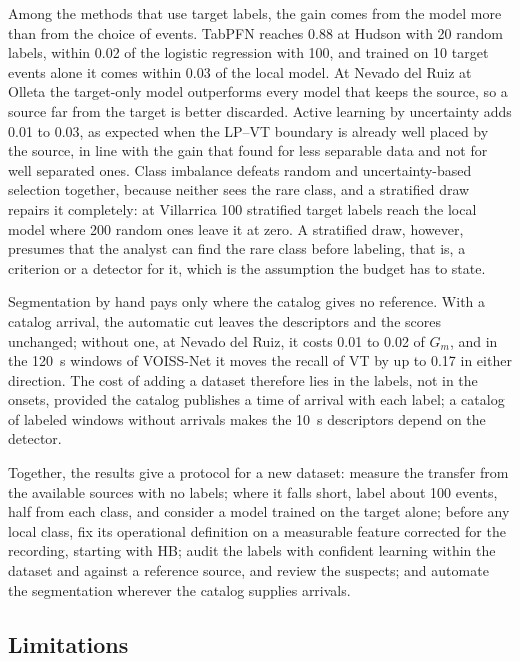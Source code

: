 \documentclass[pdflatex,sn-mathphys-num]{sn-jnl}
\begin{document}
Among the methods that use target labels, the gain comes from the model more
than from the choice of events. TabPFN reaches 0.88 at Hudson with 20 random labels, within 0.02 of the
logistic regression with 100, and trained on 10 target events alone it
comes within 0.03 of the local model. At Nevado del Ruiz at Olleta the
target-only model outperforms every model that keeps the source, so a
source far from the target is better discarded. Active
learning by uncertainty adds 0.01 to 0.03, as expected when the LP--VT
boundary is already well placed by the source, in line with the gain that \cite{manley_deep_2022} found for less separable
data and not for well separated ones. Class imbalance defeats random and
uncertainty-based selection together, because neither sees the rare class,
and a stratified draw repairs it completely: at Villarrica 100 stratified
target labels reach the local model where 200 random ones leave it at zero.
A stratified draw, however, presumes that the analyst can find the rare
class before labeling, that is, a criterion or a detector for it, which is
the assumption the budget has to state.

Segmentation by hand pays only where the catalog gives no reference. With a
catalog arrival, the automatic cut leaves the descriptors and the scores
unchanged; without one, at Nevado del Ruiz, it costs 0.01 to 0.02 of $G_m$,
and in the 120~s windows of VOISS-Net it moves the recall of VT by up to
0.17 in either direction. The cost of adding a dataset therefore lies in the
labels, not in the onsets, provided the catalog publishes a time of arrival
with each label; a catalog of labeled windows without arrivals makes the
10~s descriptors depend on the detector.

Together, the results give a protocol for a new dataset: measure the
transfer from the available sources with no labels; where it falls short,
label about 100 events, half from each class, and consider a model trained
on the target alone; before any local class, fix its operational definition
on a measurable feature corrected for the recording, starting with HB; audit
the labels with confident learning within the dataset and against a
reference source, and review the suspects; and automate the segmentation
wherever the catalog supplies arrivals.

\subsection{Limitations}\label{subsec:limitations}
\end{document}
